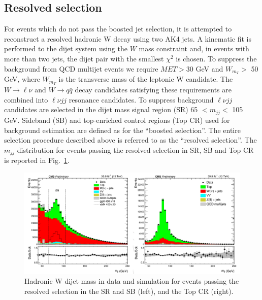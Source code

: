 \subsection*{Resolved selection}
For events which do not pass the boosted jet selection, it is attempted to reconstruct a resolved
hadronic W decay using two AK4 jets.
A kinematic fit is performed to the dijet system using
the $W$ mass constraint and, in events with more than two jets, the dijet pair with the smallest $\chi^2$ is
chosen.
To suppress the background from QCD multijet events we require $MET>$30 GeV and
 $W_{m_T} >$ 50 GeV, where $W_{m_T}$ is the transverse mass of the leptonic W candidate. 
The $W \to \ell \nu$ and $W \to q \bar{q}$  decay candidates satisfying these requirements are combined into $\ell \nu jj$ resonance
candidates. To suppress background $\ell \nu jj$ candidates are selected in the dijet mass signal region (SR)
65 $< m_{jj} <$ 105 GeV. Sideband (SB) and top-enriched control regions (Top CR) used for background estimation are
defined as for the ``boosted selection''.
The entire selection procedure described above is referred to as the ``resolved selection''.
The $m_{jj}$ distribution for events passing the resolved selection in SR,  SB and  Top CR is reported in Fig.~\ref{mjj}.
\begin{figure}
\centering
\includegraphics[scale= 0.8]{../Cap5/mjj}
\caption{Hadronic W dijet mass in data and simulation for events passing the resolved selection in the SR and SB (left), and the Top CR (right).}
\label{mjj}
\end{figure}



